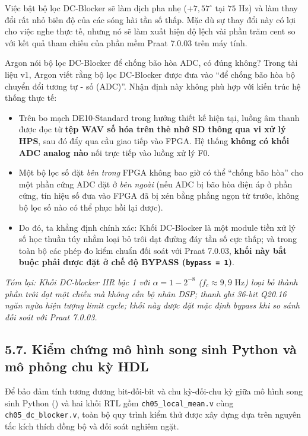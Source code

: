 Việc bật bộ lọc DC-Blocker sẽ làm dịch pha nhẹ ($+7{,}57^\circ$ tại $75\text{ Hz}$) và làm thay đổi rất nhỏ biên độ của các sóng hài tần số thấp. Mặc dù sự thay đổi này có lợi cho việc nghe thực tế, nhưng nó sẽ làm xuất hiện độ lệch vài phần trăm cent so với kết quả tham chiếu của phần mềm Praat 7.0.03 trên máy tính.

\begin{thoughtqa}{Argon nói bộ lọc DC-Blocker để chống bão hòa ADC, có đúng không?}
Trong tài liệu v1, Argon viết rằng bộ lọc DC-Blocker được đưa vào ``để chống bão hòa bộ chuyển đổi tương tự - số (ADC)''. Nhận định này không phù hợp với kiến trúc hệ thống thực tế:
\begin{itemize}[leftmargin=1.5em, itemsep=2pt]
    \item Trên bo mạch DE10-Standard trong hướng thiết kế hiện tại, luồng âm thanh được đọc từ \textbf{tệp WAV số hóa trên thẻ nhớ SD thông qua vi xử lý HPS}, sau đó đẩy qua cầu giao tiếp vào FPGA. Hệ thống \textbf{không có khối ADC analog nào} nối trực tiếp vào luồng xử lý F0.
    \item Một bộ lọc số đặt \emph{bên trong} FPGA không bao giờ có thể ``chống bão hòa'' cho một phần cứng ADC đặt ở \emph{bên ngoài} (nếu ADC bị bão hòa điện áp ở phần cứng, tín hiệu số đưa vào FPGA đã bị xén bằng phẳng ngọn từ trước, không bộ lọc số nào có thể phục hồi lại được).
    \item Do đó, ta khẳng định chính xác: Khối DC-Blocker là một module tiền xử lý số học thuần túy nhằm loại bỏ trôi dạt đường đáy tần số cực thấp; và trong toàn bộ các phép đo kiểm chuẩn đối soát với Praat 7.0.03, \textbf{khối này bắt buộc phải được đặt ở chế độ BYPASS (\texttt{bypass = 1})}.
\end{itemize}
\end{thoughtqa}

\textit{Tóm lại: Khối DC-blocker IIR bậc 1 với $\alpha = 1 - 2^{-8}$ ($f_c \approx 9{,}9\text{ Hz}$) loại bỏ thành phần trôi dạt một chiều mà không cần bộ nhân DSP; thanh ghi 36-bit Q20.16 ngăn ngừa hiện tượng limit cycle; khối này được đặt mặc định bypass khi so sánh đối soát với Praat 7.0.03.}

\subsection*{5.7. Kiểm chứng mô hình song sinh Python và mô phỏng chu kỳ HDL}

Để bảo đảm tính tương đương bit-đối-bit và chu kỳ-đối-chu kỳ giữa mô hình song sinh Python () và hai khối RTL gồm \texttt{ch05\_local\_mean.v} cùng \texttt{ch05\_dc\_blocker.v}, toàn bộ quy trình kiểm thử được xây dựng dựa trên nguyên tắc kích thích đồng bộ và đối soát nghiêm ngặt.

